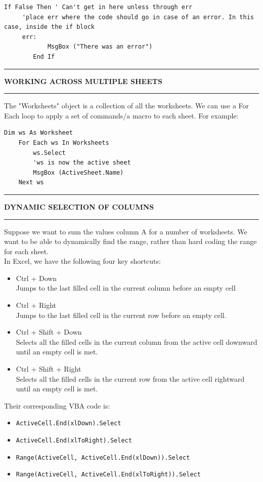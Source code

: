 \documentclass[8pt]{extarticle}
\newcommand{\heading}[1]{%
    \noindent
    \rule{\linewidth}{0.4pt}
    \begin{center}
        \vspace{-1ex}
        \textbf{#1}        
        \vspace{-2.5ex}
    \end{center}
    \rule{\linewidth}{0.4pt}
}
\begin{document}
\begin{multicols}{3}
\begin{lstlisting}[style=vba]
        If False Then ' Can't get in here unless through err
     'place err where the code should go in case of an error. In this case, inside the if block
     err:
            MsgBox ("There was an error")
        End If
\end{lstlisting}

\heading{WORKING ACROSS MULTIPLE SHEETS}

The "Worksheets" object is a collection of all the worksheets. We can use a For Each loop to apply a set of commands/a macro to each sheet. For example:

\columnbreak
\begin{lstlisting}[style=vba]
    Dim ws As Worksheet
    For Each ws In Worksheets
        ws.Select
        'ws is now the active sheet
        MsgBox (ActiveSheet.Name)
    Next ws
\end{lstlisting}

\heading{DYNAMIC SELECTION OF COLUMNS}

Suppose we want to sum the values column A for a number of worksheets. We want to be able to dynamically find the range, rather than hard coding the range for each sheet. \\

In Excel, we have the following four key shortcuts:
\begin{itemize}
    \item Ctrl + Down \\
     Jumps to the last filled cell in the current column before an empty cell
     \item Ctrl + Right \\
     Jumps to the last filled cell in the current row before an empty cell.
     \item Ctrl + Shift + Down \\
     Selects all the filled cells in the current column from the active cell downward until an empty cell is met.
     \item Ctrl + Shift + Right \\
     Selects all the filled cells in the current row from the active cell rightward until an empty cell is met.
\end{itemize}
Their corresponding VBA code is:
\begin{itemize}
    \item \texttt{ActiveCell.End(xlDown).Select} 
    \item \texttt{ActiveCell.End(xlToRight).Select}
    \item \texttt{Range(ActiveCell, ActiveCell.End(xlDown)).Select} 
    \item \texttt{Range(ActiveCell, ActiveCell.End(xlToRight)).Select} 
\end{itemize}


\end{multicols}
\end{document}
